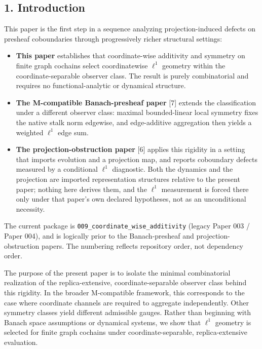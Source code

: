 \documentclass[
  11pt,
]{article}
\providecommand{\tightlist}{%
  \setlength{\itemsep}{0pt}\setlength{\parskip}{0pt}}
\providecommand{\tightlist}{%
  \setlength{\itemsep}{0pt}\setlength{\parskip}{0pt}}
\begin{document}
\hypertarget{introduction}{%
\subsection{1. Introduction}\label{introduction}}

This paper is the first step in a sequence analyzing projection-induced
defects on presheaf coboundaries through progressively richer structural
settings:

\begin{itemize}
\tightlist
\item
  \textbf{This paper} establishes that coordinate-wise additivity and
  symmetry on finite graph cochains select coordinatewise \(\ell^1\)
  geometry within the coordinate-separable observer class. The result is
  purely combinatorial and requires no functional-analytic or dynamical
  structure.
\item
  \textbf{The M-compatible Banach-presheaf paper} {[}7{]} extends the
  classification under a different observer class: maximal
  bounded-linear local symmetry fixes the native stalk norm edgewise,
  and edge-additive aggregation then yields a weighted \(\ell^1\) edge
  sum.
\item
  \textbf{The projection-obstruction paper} {[}6{]} applies this
  rigidity in a setting that imports evolution and a projection map, and
  reports coboundary defects measured by a conditional \(\ell^1\)
  diagnostic. Both the dynamics and the projection are imported
  representation structures relative to the present paper; nothing here
  derives them, and the \(\ell^1\) measurement is forced there only
  under that paper's own declared hypotheses, not as an unconditional
  necessity.
\end{itemize}

The current package is
\texttt{009\_\allowbreak{}coordinate\_\allowbreak{}wise\_\allowbreak{}additivity}
(legacy Paper 003 / Paper 004), and is logically prior to the
Banach-presheaf and projection-obstruction papers. The numbering
reflects repository order, not dependency order.

The purpose of the present paper is to isolate the minimal combinatorial
realization of the replica-extensive, coordinate-separable observer
class behind this rigidity. In the broader M-compatible framework, this
corresponds to the case where coordinate channels are required to
aggregate independently. Other symmetry classes yield different
admissible gauges. Rather than beginning with Banach space assumptions
or dynamical systems, we show that \(\ell^1\) geometry is selected for
finite graph cochains under coordinate-separable, replica-extensive
evaluation.
\end{document}
